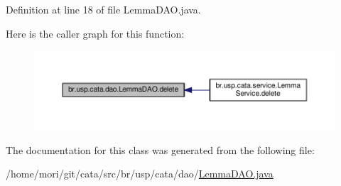Definition at line 18 of file Lemma\+D\+A\+O.\+java.



Here is the caller graph for this function\+:\nopagebreak
\begin{figure}[H]
\begin{center}
\leavevmode
\includegraphics[width=350pt]{classbr_1_1usp_1_1cata_1_1dao_1_1_lemma_d_a_o_a5ef6306bc7fd96568afb848111530f62_icgraph}
\end{center}
\end{figure}




The documentation for this class was generated from the following file\+:\begin{DoxyCompactItemize}
\item 
/home/mori/git/cata/src/br/usp/cata/dao/\hyperlink{_lemma_d_a_o_8java}{Lemma\+D\+A\+O.\+java}\end{DoxyCompactItemize}
